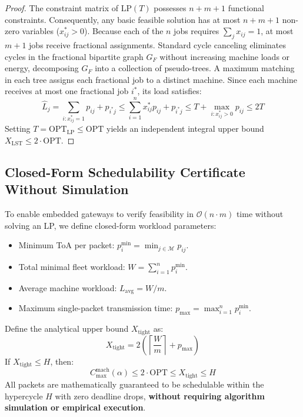 \documentclass{article}
\begin{document}
\begin{proof}
The constraint matrix of $\text{LP}(T)$ possesses $n + m + 1$ functional constraints. Consequently, any basic feasible solution has at most $n + m + 1$ non-zero variables ($x^*_{ij} > 0$). Because each of the $n$ jobs requires $\sum_j x_{ij} = 1$, at most $m + 1$ jobs receive fractional assignments. Standard cycle canceling eliminates cycles in the fractional bipartite graph $G_F$ without increasing machine loads or energy, decomposing $G_F$ into a collection of pseudo-trees. A maximum matching in each tree assigns each fractional job to a distinct machine. Since each machine receives at most one fractional job $i^*$, its load satisfies:
\begin{equation}
\hat{L}_j = \sum_{i: x^*_{ij}=1} p_{ij} + p_{i^* j} \le \sum_{i=1}^n x^*_{ij} p_{ij} + p_{i^* j} \le T + \max_{i: x^*_{ij}>0} p_{ij} \le 2T
\end{equation}
Setting $T = \text{OPT}_{\text{LP}} \le \text{OPT}$ yields an independent integral upper bound $X_{\text{LST}} \le 2 \cdot \text{OPT}$.
\end{proof}

\subsection{Closed-Form Schedulability Certificate Without Simulation}

To enable embedded gateways to verify feasibility in $\mathcal{O}(n \cdot m)$ time without solving an LP, we define closed-form workload parameters:
\begin{itemize}
    \item Minimum ToA per packet: $p_i^{\min} = \min_{j \in \mathcal{M}} p_{ij}$.
    \item Total minimal fleet workload: $W = \sum_{i=1}^n p_i^{\min}$.
    \item Average machine workload: $L_{\text{avg}} = W / m$.
    \item Maximum single-packet transmission time: $p_{\max} = \max_{i=1}^n p_i^{\min}$.
\end{itemize}

\begin{theorem}
\label{thm:apriori_feasibility}
Define the analytical upper bound $X_{\text{tight}}$ as:
\begin{equation}
\label{eq:x_tight}
X_{\text{tight}} = 2 \left( \left\lceil \frac{W}{m} \right\rceil + p_{\max} \right)
\end{equation}
If $X_{\text{tight}} \le H$, then:
\begin{equation}
C_{\max}^{\text{mach}}(\alpha) \le 2 \cdot \text{OPT} \le X_{\text{tight}} \le H
\end{equation}
All packets are mathematically guaranteed to be schedulable within the hypercycle $H$ with zero deadline drops, \textbf{without requiring algorithm simulation or empirical execution}.
\end{theorem}
\end{document}
